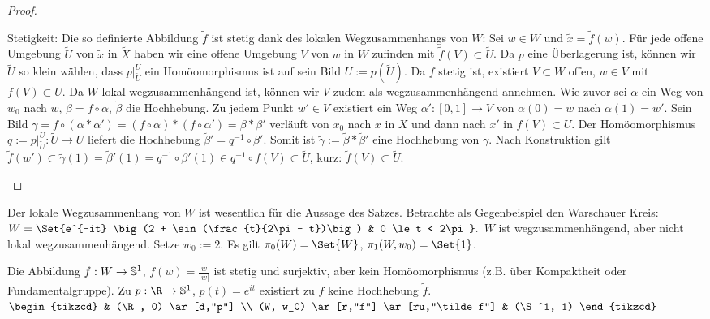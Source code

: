 \begin{st}
\begin{proof}
\begin{seg}{\ProofImplication*}
            Stetigkeit:
            Die so definierte Abbildung $\tilde f$ ist stetig dank des lokalen Wegzusammenhangs von $W$:
            Sei $w \in W$ und $\tilde x = \tilde f(w)$.
            Für jede offene Umgebung $\tilde U$ von $\tilde x$ in $\tilde X$ haben wir eine offene Umgebung $V$ von $w$ in $W$ zufinden mit $\tilde f(V) \subset \tilde U$.
            Da $p$ eine Überlagerung ist, können wir $\tilde U$ so klein wählen, dass $p|_{\tilde U}^U$ ein Homöomorphismus ist auf sein Bild $U := p(\tilde U)$.
            Da $f$ stetig ist, existiert $V \subset W$ offen, $w \in V$ mit $f(V) \subset U$.
            Da $W$ lokal wegzusammenhängend ist, können wir $V$ zudem als wegzusammenhängend annehmen.
            Wie zuvor sei $\alpha$ ein Weg von $w_0$ nach $w$, $\beta = f \circ \alpha$, $\tilde \beta$ die Hochhebung.
            Zu jedem Punkt $w' \in V$ existiert ein Weg $\alpha': [0,1] \to V$ von $\alpha(0) = w$ nach $\alpha(1) = w'$.
            Sein Bild $\gamma = f \circ (\alpha \ast \alpha') = (f \circ \alpha) \ast (f \circ \alpha') = \beta \ast \beta'$ verläuft von $x_0$ nach $x$ in $X$ und dann nach $x'$ in $f(V) \subset U$.
            Der Homöomorphismus $q := p|_{\tilde U}^U: \tilde U \to U$ liefert die Hochhebung $\tilde \beta' = q^{-1} \circ \beta'$.
            Somit ist $\tilde \gamma := \tilde \beta \ast \tilde \beta'$ eine Hochhebung von $\gamma$.
            Nach Konstruktion gilt $\tilde f(w') \subset \tilde \gamma(1) = \tilde \beta '(1) = q^{-1} \circ \beta'(1) \in q^{-1} \circ f(V) \subset \tilde U$, kurz: $\tilde f(V) \subset \tilde U$.
        \end{seg}
    \end{proof}
    \begin{nt}
        Der lokale Wegzusammenhang von $W$ ist wesentlich für die Aussage des Satzes.
        Betrachte als Gegenbeispiel den Warschauer Kreis:
        \begin{math}
            W = \Set{e^{-it} \big(2 + \sin(\frac{t}{2\pi - t})\big) & 0 \le t < 2\pi}.
        \end{math}
        $W$ ist wegzusammenhängend, aber nicht lokal wegzusammenhängend.
        Setze $w_0 := 2$.
        Es gilt $\pi_0(W) = \Set{W}$, $\pi_1(W, w_0) = \Set{1}$.

        Die Abbildung $f: W \to \S^1$, $f(w) = \frac{w}{|w|}$ ist stetig und surjektiv, aber kein Homöomorphismus (z.B. über Kompaktheit oder Fundamentalgruppe).
        Zu $p: \R \to \S^1$, $p(t) = e^{it}$ existiert zu $f$ keine Hochhebung $\tilde f$.
        \begin{math}
            \begin{tikzcd}
                & (\R, 0) \ar[d,"p"] \\
                (W, w_0) \ar[r,"f"] \ar[ru,"\tilde f"] & (\S^1, 1)
            \end{tikzcd}
        \end{math}
    \end{nt}
\end{st}

